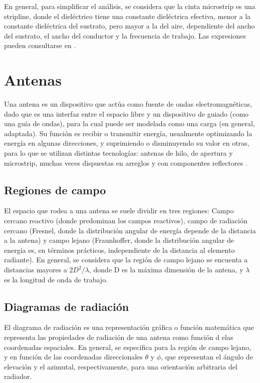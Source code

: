 En general, para simplificar el análisis, se considera que la cinta microstrip es una stripline, donde el dieléctrico tiene una constante dieléctrica efectiva, menor a la constante dieléctrica del sustrato, pero mayor a la del aire, dependiente del ancho del sustrato, el ancho del conductor y la frecuencia de trabajo. Las expresiones pueden consultarse en \cite{Pozar:MwEngineering}.

\section{Antenas}
\label{subsec_antenas}

Una antena es un dispositivo que actúa como fuente de ondas electromagnéticas, dado que es una interfaz entre el espacio libre y un dispositivo de guiado (como una guía de ondas), para la cual puede ser modelada como una carga (en general, adaptada). Su función es recibir o transmitir energía, usualmente optimizando la energía en algunas direcciones, y suprimiendo o disminuyendo su valor en otras, para lo que se utilizan distintas tecnologías: antenas de hilo, de apertura y microstrip, muchas veces dispuestas en arreglos y con componentes reflectores \cite{Balanis:Theory}.

\subsection{Regiones de campo}
\label{subsubsec_regiones_de_campo}
El espacio que rodea a una antena se suele dividir en tres regiones: Campo cercano reactivo (donde predominan los campos reactivos), campo de radiación cercano (Fresnel, donde la distribución angular de energía depende de la distancia a la antena) y campo lejano (Fraunhoffer, donde la distribución angular de energía es, en términos prácticos, independiente de la distancia al elemento radiante). En general, se considera que la región de campo lejano se encuenta a distancias mayores a $2D^2/\lambda$, donde D es la máxima dimensión de la antena, y $\lambda$ es la longitud de onda de trabajo.

\subsection{Diagramas de radiación}
\label{subsubsec_diag_de_rad}
El diagrama de radiación es una representación gráfica o función matemática que representa las propiedades de radiación de una antena como función d elas coordenadas espaciales. En general, se especifica para la región de campo lejano, y en función de las coordenadas direccionales $\theta$ y $\phi$, que representan el ángulo de elevación y el azimutal, respectivamente, para una orientación arbitraria del radiador.


